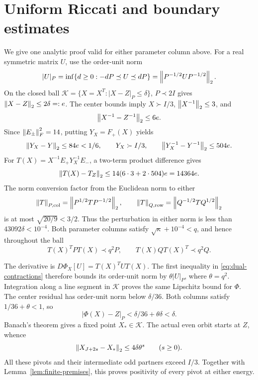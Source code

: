\section{Uniform Riccati and boundary estimates}
\label{sec:uniform}

We give one analytic proof valid for either parameter column above.
For a real symmetric matrix $U$, use the order-unit norm
\[
 |U|_P=\inf\{d\ge0:-dP\preceq U\preceq dP\}
      =\left\lVert P^{-1/2}UP^{-1/2}\right\rVert_2.
\]
On the closed ball $\mathcal K=\{X=X^T:|X-Z|_P\le\delta\}$,
$P\prec2I$ gives $\left\lVert X-Z\right\rVert_2\le2\delta=:e$.
The center bounds imply $X\succ I/3$, $\left\lVert X^{-1}\right\rVert_2\le3$, and
\[
 \left\lVert X^{-1}-Z^{-1}\right\rVert_2\le6e.
\]
Since $\left\lVert E_\pm\right\rVert_F^2=14$, putting $Y_X=F_+(X)$ yields
\[
 \left\lVert Y_X-Y\right\rVert_2\le84e<1/6,\qquad
 Y_X\succ I/3,\qquad
 \left\lVert Y_X^{-1}-Y^{-1}\right\rVert_2\le504e.
\]
For $T(X)=X^{-1}E_+Y_X^{-1}E_-$, a two-term product difference gives
\begin{equation}
 \left\lVert T(X)-T_Z\right\rVert_2\le14(6\cdot3+2\cdot504)e=14364e.
 \label{eq:Tperturb}
\end{equation}
The norm conversion factor from the Euclidean norm to either
\[
 \left\lVert T\right\rVert_{P,\mathrm{col}}=\left\lVert P^{1/2}TP^{-1/2}\right\rVert_2,
 \qquad
 \left\lVert T\right\rVert_{Q,\mathrm{row}}=\left\lVert Q^{-1/2}TQ^{1/2}\right\rVert_2
\]
is at most $\sqrt{20/9}<3/2$. Thus the perturbation in either norm is
less than $43092\delta<10^{-4}$. Both parameter columns satisfy
$\sqrt\kappa+10^{-4}<q$, and hence throughout the ball
\begin{equation}
 T(X)^TPT(X)\prec q^2P,\qquad T(X)QT(X)^T\prec q^2Q.
 \label{eq:dual-contractions}
\end{equation}

The derivative is $D\Phi_X[U]=T(X)^TUT(X)$. The first inequality in
\eqref{eq:dual-contractions} therefore bounds its order-unit norm by
$\theta|U|_P$, where $\theta=q^2$. Integration along a line segment in
$\mathcal K$ proves the same Lipschitz bound for $\Phi$. The center
residual has order-unit norm below $\delta/36$. Both columns satisfy
$1/36+\theta<1$, so
\[
 |\Phi(X)-Z|_P<\delta/36+\theta\delta<\delta.
\]
Banach's theorem gives a fixed point $X_*\in\mathcal K$. The actual
even orbit starts at $Z$, whence
\begin{equation}
 \left\lVert X_{J+2s}-X_*\right\rVert_2\le4\delta\theta^s\qquad(s\ge0).
 \label{eq:pivot-decay}
\end{equation}
All these pivots and their intermediate odd partners exceed $I/3$.
Together with Lemma~\ref{lem:finite-premises}, this proves positivity of
every pivot at either energy.

